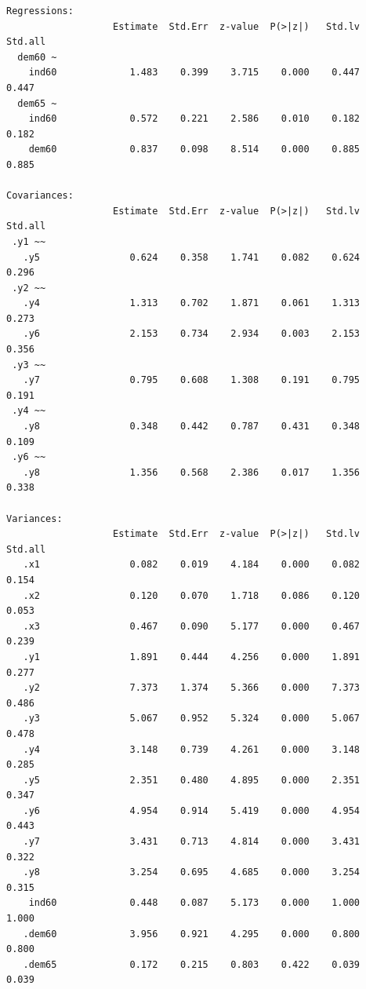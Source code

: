 \begin{verbatim}
Regressions:
                   Estimate  Std.Err  z-value  P(>|z|)   Std.lv  Std.all
  dem60 ~                                                               
    ind60             1.483    0.399    3.715    0.000    0.447    0.447
  dem65 ~                                                               
    ind60             0.572    0.221    2.586    0.010    0.182    0.182
    dem60             0.837    0.098    8.514    0.000    0.885    0.885

Covariances:
                   Estimate  Std.Err  z-value  P(>|z|)   Std.lv  Std.all
 .y1 ~~                                                                 
   .y5                0.624    0.358    1.741    0.082    0.624    0.296
 .y2 ~~                                                                 
   .y4                1.313    0.702    1.871    0.061    1.313    0.273
   .y6                2.153    0.734    2.934    0.003    2.153    0.356
 .y3 ~~                                                                 
   .y7                0.795    0.608    1.308    0.191    0.795    0.191
 .y4 ~~                                                                 
   .y8                0.348    0.442    0.787    0.431    0.348    0.109
 .y6 ~~                                                                 
   .y8                1.356    0.568    2.386    0.017    1.356    0.338

Variances:
                   Estimate  Std.Err  z-value  P(>|z|)   Std.lv  Std.all
   .x1                0.082    0.019    4.184    0.000    0.082    0.154
   .x2                0.120    0.070    1.718    0.086    0.120    0.053
   .x3                0.467    0.090    5.177    0.000    0.467    0.239
   .y1                1.891    0.444    4.256    0.000    1.891    0.277
   .y2                7.373    1.374    5.366    0.000    7.373    0.486
   .y3                5.067    0.952    5.324    0.000    5.067    0.478
   .y4                3.148    0.739    4.261    0.000    3.148    0.285
   .y5                2.351    0.480    4.895    0.000    2.351    0.347
   .y6                4.954    0.914    5.419    0.000    4.954    0.443
   .y7                3.431    0.713    4.814    0.000    3.431    0.322
   .y8                3.254    0.695    4.685    0.000    3.254    0.315
    ind60             0.448    0.087    5.173    0.000    1.000    1.000
   .dem60             3.956    0.921    4.295    0.000    0.800    0.800
   .dem65             0.172    0.215    0.803    0.422    0.039    0.039
\end{verbatim}

